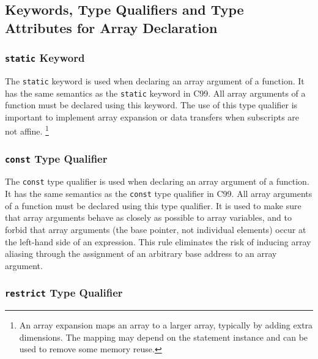 \subsection{Keywords, Type Qualifiers and Type Attributes for Array Declaration}
\label{sec:array-type-qualifiers-section}

\subsubsection{\lstinline!static! Keyword}
\label{sec:static}


The \lstinline!static! keyword is used when declaring an array argument of a \pencil function.
It
has the same semantics as the \lstinline!static! keyword in C99.
All array arguments of a \pencil function
must be declared using this keyword.
The use of this type qualifier is
important to implement array expansion or data transfers when
subscripts are not affine.%
\footnote{An array expansion maps an array to a larger array, typically
by adding extra dimensions.  The mapping may depend on the statement
instance and can be used to remove some memory reuse.}


\subsubsection{\lstinline!const! Type Qualifier}
\label{sec:const}

The \lstinline!const! type qualifier is used when declaring an array argument of a \pencil function.
It
has the same semantics as the \lstinline!const! type qualifier in C99.
All array arguments of a \pencil function
must be declared using this type qualifier.
It is used to make sure that array arguments behave as closely as possible to
array variables, and to forbid that array arguments (the base
pointer, not individual elements) occur at the left-hand side of an
expression.  This rule eliminates the risk of inducing array aliasing
through the assignment of an arbitrary base address to an array
argument.

\subsubsection{\lstinline!restrict! Type Qualifier}
\label{sec:restrict}



